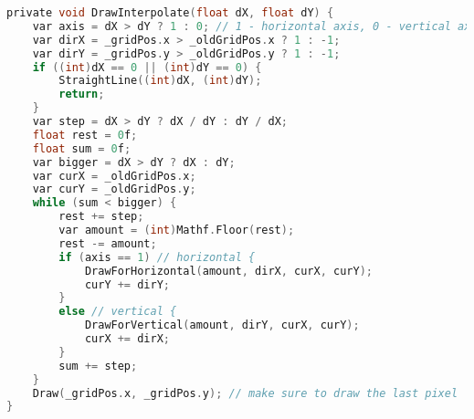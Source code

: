 \begin{lstlisting}[language={C},label=lst:draw_interpolate,caption={Metoda \texttt{DrawInterpolate} interpolująca pomiędzy dwoma punktami}]
private void DrawInterpolate(float dX, float dY) {
    var axis = dX > dY ? 1 : 0; // 1 - horizontal axis, 0 - vertical axis
    var dirX = _gridPos.x > _oldGridPos.x ? 1 : -1;
    var dirY = _gridPos.y > _oldGridPos.y ? 1 : -1;
    if ((int)dX == 0 || (int)dY == 0) {
        StraightLine((int)dX, (int)dY);
        return;
    }
    var step = dX > dY ? dX / dY : dY / dX;
    float rest = 0f;
    float sum = 0f;
    var bigger = dX > dY ? dX : dY;
    var curX = _oldGridPos.x;
    var curY = _oldGridPos.y;
    while (sum < bigger) {
        rest += step;
        var amount = (int)Mathf.Floor(rest);
        rest -= amount;
        if (axis == 1) // horizontal {
            DrawForHorizontal(amount, dirX, curX, curY);
            curY += dirY;
        }
        else // vertical {
            DrawForVertical(amount, dirY, curX, curY);
            curX += dirX;
        }
        sum += step;
    }
    Draw(_gridPos.x, _gridPos.y); // make sure to draw the last pixel  
}
\end{lstlisting}